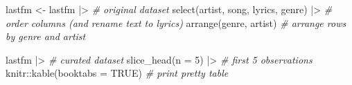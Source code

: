 \documentclass[
  letterpaper,
]{latex/krantz}
\newenvironment{Shaded}{\begin{snugshade}}{\end{snugshade}}
\newcommand{\AttributeTok}[1]{\textcolor[rgb]{0.00,0.00,0.00}{#1}}
\newcommand{\CommentTok}[1]{\textcolor[rgb]{0.00,0.00,0.00}{\textit{#1}}}
\newcommand{\ConstantTok}[1]{\textcolor[rgb]{0.00,0.00,0.00}{#1}}
\newcommand{\DecValTok}[1]{\textcolor[rgb]{0.00,0.00,0.00}{#1}}
\newcommand{\FunctionTok}[1]{\textcolor[rgb]{0.00,0.00,0.00}{#1}}
\newcommand{\NormalTok}[1]{\textcolor[rgb]{0.00,0.00,0.00}{#1}}
\newcommand{\OtherTok}[1]{\textcolor[rgb]{0.00,0.00,0.00}{#1}}
\newcommand{\SpecialCharTok}[1]{\textcolor[rgb]{0.00,0.00,0.00}{#1}}
\begin{document}
\begin{Shaded}
\begin{Highlighting}[]
\NormalTok{lastfm }\OtherTok{\textless{}{-}} 
\NormalTok{  lastfm }\SpecialCharTok{|\textgreater{}} \CommentTok{\# original dataset}
  \FunctionTok{select}\NormalTok{(artist, song, lyrics, genre) }\SpecialCharTok{|\textgreater{}} \CommentTok{\# order columns (and rename \textasciigrave{}text\textasciigrave{} to \textasciigrave{}lyrics\textasciigrave{})}
  \FunctionTok{arrange}\NormalTok{(genre, artist) }\CommentTok{\# arrange rows by \textasciigrave{}genre\textasciigrave{} and \textasciigrave{}artist\textasciigrave{}}

\NormalTok{lastfm }\SpecialCharTok{|\textgreater{}} \CommentTok{\# curated dataset}
  \FunctionTok{slice\_head}\NormalTok{(}\AttributeTok{n =} \DecValTok{5}\NormalTok{) }\SpecialCharTok{|\textgreater{}} \CommentTok{\# first 5 observations}
\NormalTok{  knitr}\SpecialCharTok{::}\FunctionTok{kable}\NormalTok{(}\AttributeTok{booktabs =} \ConstantTok{TRUE}\NormalTok{) }\CommentTok{\# print pretty table}
\end{Highlighting}
\end{Shaded}
\end{document}
